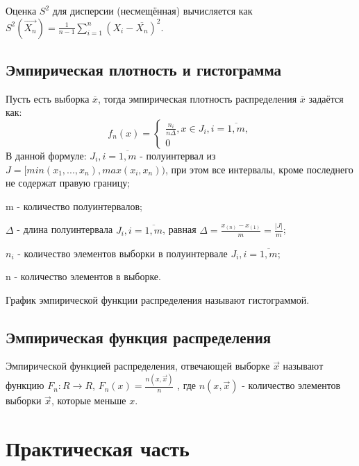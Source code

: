 Оценка $S^{2}$ для дисперсии (несмещённая) вычисляется как $S^{2}(\overrightarrow{X_{n}}) = \frac{1}{n - 1}\sum\limits_{i=1}^{n}(X_{i} - \overline{X_{n}})^{2}$.
\section{Эмпирическая плотность и гистограмма}
Пусть есть выборка $\overline{x}$, тогда эмпирическая плотность распределения $\overline{x}$ задаётся как:
\begin{equation}
f_{n}(x) = 
\begin{cases}
\frac{n_{i}}{n \Delta}, x \in J_{i}, i = \overline{1, m},\\
0
\end{cases}
\end{equation}
В данной формуле:
$J_{i}, i = \overline{1, m}$ - полуинтервал из $J = [min(x_{1}, ..., x_{n}), max(x_{i}, x_{n}))$, при этом все интервалы, кроме последнего не содержат правую границу;

m - количество полуинтервалов;

$\Delta$ - длина полуинтервала $J_{i}, i = \overline{1, m}$, равная $\Delta = \frac{x_{(n)} - x_{(1)}}{m} = \frac{|J|}{m}$;

$n_{i}$ - количество элементов выборки в полуинтервале $J_{i}, i = \overline{1, m}$;

n - количество элементов в выборке.

График эмпирической функции распределения называют гистограммой.

\section{Эмпирическая функция распределения}

Эмпирической функцией распределения, отвечающей выборке $\overrightarrow{x}$ называют функцию $F_{n}: R \rightarrow R$, $F_{n}(x) = \frac{n(x, \overrightarrow{x})}{n}$ , где $n(x, \overrightarrow{x})$ - количество элементов выборки $\overrightarrow{x}$, которые меньше $x$.

\chapter{Практическая часть}
